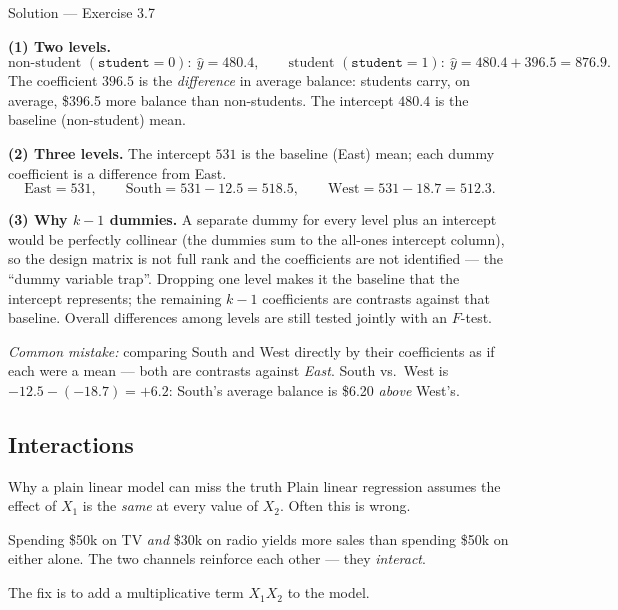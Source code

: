 \documentclass[aspectratio=169,11pt]{beamer}
\begin{document}
\begin{frame}{Solution --- Exercise 3.7}
  \begin{solutionbox}
    \scriptsize
    \textbf{(1) Two levels.}
    \[
      \text{non-student }(\texttt{student}=0):\ \hat y = 480.4,\qquad
      \text{student }(\texttt{student}=1):\ \hat y = 480.4+396.5 = 876.9.
    \]
    The coefficient $396.5$ is the \emph{difference} in average balance:
    students carry, on average, \$396.5 more balance than non-students.
    The intercept $480.4$ is the baseline (non-student) mean.

    \textbf{(2) Three levels.} The intercept $531$ is the baseline
    (East) mean; each dummy coefficient is a difference from East.
    \[
      \text{East}=531,\qquad
      \text{South}=531-12.5=518.5,\qquad
      \text{West}=531-18.7=512.3.
    \]

    \textbf{(3) Why $k-1$ dummies.} A separate dummy for every level
    plus an intercept would be perfectly collinear (the dummies sum to
    the all-ones intercept column), so the design matrix is not full
    rank and the coefficients are not identified --- the ``dummy
    variable trap''. Dropping one level makes it the baseline that the
    intercept represents; the remaining $k-1$ coefficients are
    contrasts against that baseline. Overall differences among levels
    are still tested jointly with an $F$-test.

    \medskip
    \textit{Common mistake:} comparing South and West directly by their
    coefficients as if each were a mean --- both are contrasts against
    \emph{East}. South vs.\ West is $-12.5-(-18.7)=+6.2$: South's average
    balance is \$6.20 \emph{above} West's.
  \end{solutionbox}
\end{frame}

\subsection{Interactions}

\begin{frame}{Why a plain linear model can miss the truth}
  Plain linear regression assumes the effect of $X_1$ is the \emph{same}
  at every value of $X_2$. Often this is wrong.
  \begin{numexample}
    Spending \$50k on TV \emph{and} \$30k on radio yields more sales
    than spending \$50k on either alone. The two channels reinforce
    each other --- they \emph{interact}.
  \end{numexample}
  \begin{takeaway}
    The fix is to add a multiplicative term $X_1 X_2$ to the model.
  \end{takeaway}
\end{frame}
\end{document}
